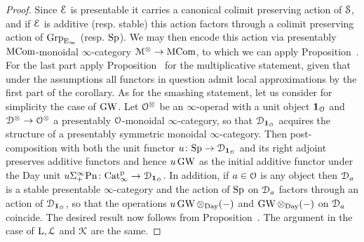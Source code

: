 \begin{proof}
Since $\mathcal{E}$ is presentable it carries a canonical colimit preserving action of $\mathcal S$, and if $\mathcal{E}$ is additive (resp. stable) this action factors through a colimit preserving action of $\operatorname{Grp}_{{\mathrm{E}_{\infty}}}$ (resp. $\mathrm{Sp}$). We may then encode this action via presentably $\mathrm{MCom}$-monoidal $\infty$-category $\mathcal{M}^{\otimes} \to \mathrm{MCom}$, %
to which we can apply Proposition~.
For the last part apply Proposition~ for the multiplicative statement, given that under the assumptions all functors in question admit local approximations by the first part of the corollary.
As for the smashing statement, let us consider for simplicity the case of $\operatorname{GW}$. Let $\mathcal{O}^{\otimes}$ be an $\infty$-operad with a unit object $\mathbf{1}_{\mathcal{O}}$ and $\mathcal{D}^{\otimes} \to \mathcal{O}^{\otimes}$ a presentably $\mathcal{O}$-monoidal $\infty$-category, so that $\mathcal{D}_{\mathbf{1}_{\mathcal{O}}}$ acquires the structure of a presentably symmetric monoidal $\infty$-category. Then post-composition with both the unit functor $u\colon \mathrm{Sp} \to \mathcal{D}_{\mathbf{1}_{\mathcal{O}}}$ and its right adjoint preserves additive functors and hence $u\operatorname{GW}$ as the initial additive functor under the Day unit $u\Sigma^{\infty}_+\mathrm{Pn}\colon \mathrm{Cat}^{\mathrm p}_\infty \to \mathcal{D}_{\mathbf{1}_{\mathcal{O}}}$. In addition, if $a \in \mathcal{O}$ is any object then $\mathcal{D}_a$ is a stable presentable $\infty$-category and the action of $\mathrm{Sp}$ on $\mathcal{D}_a$ factors through an action of $\mathcal{D}_{\mathbf{1}_{\mathcal{O}}}$, 
so that the operations $u\operatorname{GW}\otimes_{\mathrm{Day}}(-)$ and $\operatorname{GW}\otimes_{\mathrm{Day}} (-)$ on $\mathcal{D}_a$ coincide. The desired result now follows from Proposition~. The argument in the case of $\operatorname L,\operatorname{\mathcal{L}}$ and $\operatorname{\mathcal{K}}$ are the same.
\end{proof}







